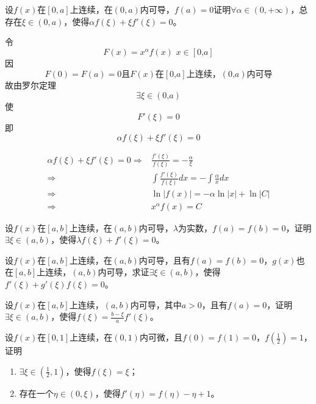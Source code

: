 \begin{example}
	设$f(x)$在$[0,a]$上连续，在$(0,a)$内可导，$f(a)=0$证明$\forall\alpha\in(0,+\infty)$，总存在$\xi\in(0,a)$，使得$\alpha f(\xi)+\xi f'(\xi)=0$。
\end{example}
	\begin{newproof}
		令\[F\left( x \right) =x^{\alpha}f\left( x \right) \,\,      x\in \left[ \text{0,}a \right] \]
		因\[F\left( 0 \right) =F\left( a \right) =\text{0且}F\left( x \right) \text{在}\left[ \text{0,}a \right] \text{上连续，}\left( \text{0,}a \right) \text{内可导}\]
		故由罗尔定理\[\exists \xi \in \left( \text{0,}a \right) \]
		使\[F'\left( \xi \right) =0\]
		即\[\alpha f\left( \xi \right) +\xi f'\left( \xi \right) =0\]
	\end{newproof}
	\begin{note}
		\begin{align*}
			\alpha f\left( \xi \right) +\xi f'\left( \xi \right) =0
			\Longrightarrow {}&	
			\frac{f'\left( \xi \right)}{f\left( \xi \right)}=-\frac{\alpha}{\xi}\\
			\Longrightarrow {}&	
			\int{\frac{f'\left( \xi \right)}{f\left( \xi \right)}dx}=-\int{\frac{\alpha}{x}dx}\\
			\Longrightarrow {}&	
			\ln\text{|}f\left( x \right) |=-\alpha \ln\text{|}x|+\ln\text{|}C|\\
			\Longrightarrow {}&	
			x^{\alpha}f\left( x \right) =C	
		\end{align*}
	\end{note}

\begin{example}
	设$f(x)$在$[a,b]$上连续，在$(a,b)$内可导，$\lambda$为实数，$f(a)=f(b)=0$，证明$\exists\xi\in(a,b)$，使得$\lambda f(\xi)+f'(\xi)=0$。
\end{example}

\begin{example}
	设$f(x)$在$[a,b]$上连续，在$(a,b)$内可导，且有$f(a)=f(b)=0$，$g(x)$也在$[a,b]$上连续，$(a,b)$内可导，求证$\exists\xi\in(a,b)$，使得$f'(\xi)+g'(\xi)f(\xi)=0$。
\end{example}

\begin{example}
	设$f(x)$在$[a,b]$上连续，$(a,b)$内可导，其中$a>0$，且有$f(a)=0$，证明$\exists\xi\in(a,b)$，使得$f(\xi)=\frac{b-\xi}{a}f'(\xi)$。
\end{example}

\begin{example}
	设$f(x)$在$[0,1]$上连续，在$(0,1)$内可微，且$f(0)=f(1)=0$，$f(\frac{1}{2})=1$，证明
	\begin{enumerate}
		\item $\exists\xi\in(\frac{1}{2},1)$，使得$f(\xi)=\xi$；
		\item 存在一个$\eta\in(0,\xi)$，使得$f'(\eta)=f(\eta)-\eta+1$。
	\end{enumerate}
\end{example}

